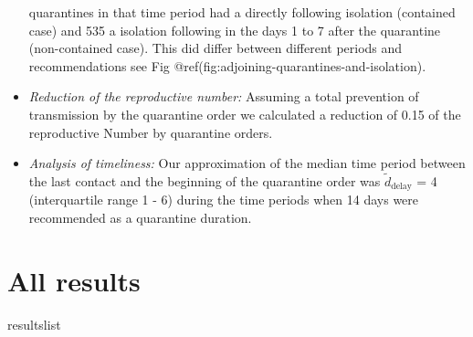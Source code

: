 \documentclass[
]{article}
\newenvironment{Shaded}{\begin{snugshade}}{\end{snugshade}}
\newcommand{\NormalTok}[1]{#1}
\begin{document}
\begin{itemize}
  quarantines in that time period had a directly following isolation
  (contained case) and 535 a isolation following in the days 1 to 7
  after the quarantine (non-contained case). This did differ between
  different periods and recommendations see Fig
  @ref(fig:adjoining-quarantines-and-isolation).
\item
  \emph{Reduction of the reproductive number:} Assuming a total
  prevention of transmission by the quarantine order we calculated a
  reduction of 0.15 of the reproductive Number by quarantine orders.
\item
  \emph{Analysis of timeliness:} Our approximation of the median time
  period between the last contact and the beginning of the quarantine
  order was \(\tilde d_{\text{delay}}\) = 4 (interquartile range 1 - 6)
  during the time periods when 14 days were recommended as a quarantine
  duration.
\end{itemize}

\hypertarget{all-results}{%
\section{All results}\label{all-results}}

\begin{Shaded}
\begin{Highlighting}[]
\NormalTok{resultslist}
\end{Highlighting}
\end{Shaded}
\end{document}
